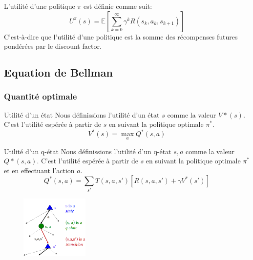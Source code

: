 L'utilité d'une politique $\pi$ est définie comme suit: 
\begin{equation}
    U^\pi(s) = \mathbb{E} \left[ \sum_{k=0}^{\infty} \gamma^k R(s_k, a_k, s_{k+1}) \right] 
\end{equation} 
C'est-à-dire que l'utilité d'une politique est la somme des récompenses futures pondérées par le discount factor.


\subsection{Equation de Bellman} %
\label{sub:equation_de_bellman}

\subsubsection{Quantité optimale} %
\label{sec:quantite_optimale}

\begin{definition}{Utilité d'un état}{}
    Nous définissions l'utilité d'un état $s$ comme la valeur $V*(s)$. 
    C'est l'utilité espérée à partir de $s$ en suivant la politique optimale $\pi^*$.
    \begin{equation*}
        V^*(s) = \max_{a} Q^*(s, a) 
    \end{equation*}
\end{definition}

\begin{definition}{Utilité d'un q-état}{}
    Nous définissions l'utilité d'un q-état $s, a$ comme la valeur $Q*(s, a)$. 
    C'est l'utilité espérée à partir de $s$ en suivant la politique optimale $\pi^*$ et en effectuant l'action $a$. 
    \begin{equation*}
        Q^*(s, a) = \sum_{s'} T(s, a, s') \left[ R(s, a, s') + \gamma V^*(s') \right]
    \end{equation*}
\end{definition}

\begin{figure}[H]
    \centering
    \includegraphics[width=0.3\textwidth]{pictures/bellmantree.png}
    \caption{}\label{fig:}
\end{figure}

